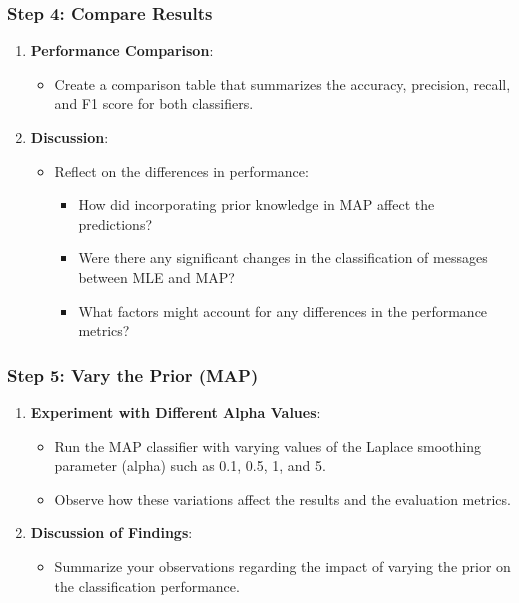 \documentclass{article}
\begin{document}
\subsubsection*{Step 4: Compare Results}
\begin{enumerate}
    \item \textbf{Performance Comparison}:
    \begin{itemize}
        \item Create a comparison table that summarizes the accuracy, precision, recall, and F1 score for both classifiers.
    \end{itemize}
    
    \item \textbf{Discussion}:
    \begin{itemize}
        \item Reflect on the differences in performance:
        \begin{itemize}
            \item How did incorporating prior knowledge in MAP affect the predictions?
            \item Were there any significant changes in the classification of messages between MLE and MAP?
            \item What factors might account for any differences in the performance metrics?
        \end{itemize}
    \end{itemize}
\end{enumerate}

\subsubsection*{Step 5: Vary the Prior (MAP)}
\begin{enumerate}
    \item \textbf{Experiment with Different Alpha Values}:
    \begin{itemize}
        \item Run the MAP classifier with varying values of the Laplace smoothing parameter (alpha) such as 0.1, 0.5, 1, and 5.
        \item Observe how these variations affect the results and the evaluation metrics.
    \end{itemize}
    
    \item \textbf{Discussion of Findings}:
    \begin{itemize}
        \item Summarize your observations regarding the impact of varying the prior on the classification performance.
    \end{itemize}
\end{enumerate}
\end{document}
